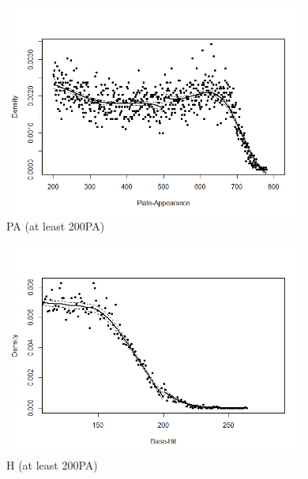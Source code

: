 \documentclass[dvipdfmx, 12pt]{article}
\begin{document}
\begin{figure}[H]
  \centering
  \includegraphics[width = 10cm, height = 7cm]{graphs/PA_500.png}
  \caption{PA (at least 200PA)}
  \label{PA_500}
\end{figure}
\begin{figure}[H]
  \centering
  \includegraphics[width = 10cm, height = 7cm]{graphs/H_200.png}
  \caption{H (at least 200PA)}
  \label{H_200}
\end{figure}
\end{document}
